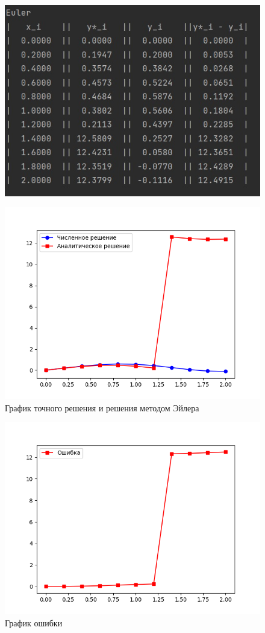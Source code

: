 \documentclass[a4paper, 14pt, fleqn]{extarticle}
\begin{document}
				\begin{figure}[h]
					\centering
					\includegraphics[width = 0.6\linewidth]{1.jpg}
				\end{figure}
				
				\begin{figure}[h]
					\centering
					\includegraphics[width = 0.6\linewidth]{euler.png}
					\caption{График точного решения и решения методом Эйлера}
				\end{figure}
				\pagebreak
				
			    \begin{figure}[h]
			    	\centering
			    	\includegraphics[width = 0.6\linewidth]{euler-error.png}
			    	\caption{График ошибки}
			    \end{figure}
			
			\pagebreak
\end{document}
